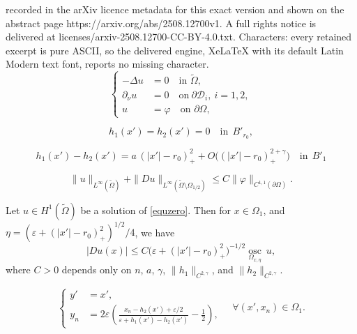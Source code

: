 \documentclass[10pt,a4paper]{amsart}
\newcommand{\osc}{\operatorname{osc}}
\begin{document}
recorded in the arXiv licence metadata for this exact version and shown on the abstract page https://arxiv.org/abs/2508.12700v1. A full rights notice is delivered at licenses/arxiv-2508.12700-CC-BY-4.0.txt. Characters: every retained excerpt is pure ASCII, so the delivered engine, XeLaTeX with its default Latin Modern text font, reports no missing character.
\begin{equation}\label{equzero}
\left\{
\begin{aligned}
-\Delta u &=0 \quad \mbox{in }\widetilde{\Omega},\\
\partial_\nu u &= 0 \quad \mbox{on}~\partial\mathcal{D}_{i},~i=1,2,\\
 u &= \varphi \quad \mbox{on } \partial \Omega,
\end{aligned}
\right.
\end{equation}

\begin{equation}\label{fg_0}
h_1(x')=h_2(x')=0 \quad \mbox{in}~~B'_{r_0},
\end{equation}

\begin{equation}\label{fg_1}
h_1(x') - h_2(x') = a\,(|x'|-r_0)^2_+ + O \Big( (|x'|-r_0)^{2+\gamma}_+ \Big) \quad \mbox{in}~~B'_{1}
\end{equation}

\begin{equation}
\label{u_C1_outside}
\|u\|_{L^\infty(\widetilde\Omega)} + \| D u\|_{{L^\infty}(\widetilde\Omega \setminus \Omega_{1/2})} \le C\|\varphi\|_{C^{1,1}(\partial \Omega)}.
\end{equation}

\begin{lemma}
    Let $u \in H^1({\widetilde\Omega})$ be a solution of \eqref{equzero}. Then for $x\in \Omega_1$, and $\eta=(\varepsilon + (|x'|-r_0)_+^2)^{1/2}/4$, we have
\begin{equation}\label{Du-bound}
    |D u(x)| \le C \big(\varepsilon + (|x'|-r_0)_+^2 \big)^{-1/2}\underset{\Omega_{x,\eta}}{\osc}~u,
\end{equation}
where $C > 0$ depends only on $n$, $a$, $\gamma$, $\|h_1\|_{C^{2,\gamma}}$, and $\|h_2\|_{C^{2,\gamma}}$.
\end{lemma}

\begin{equation}\label{x_to_y}
\left\{
\begin{aligned}
y' &= x' ,\\
y_n &=   2 \varepsilon \left( \frac{x_n - h_2(x') + \varepsilon/2}{\varepsilon + h_1(x') - h_2(x')} - \frac{1}{2} \right) ,
\end{aligned}\right.
\quad \forall (x',x_n) \in \Omega_{1}.
\end{equation}
\end{document}
